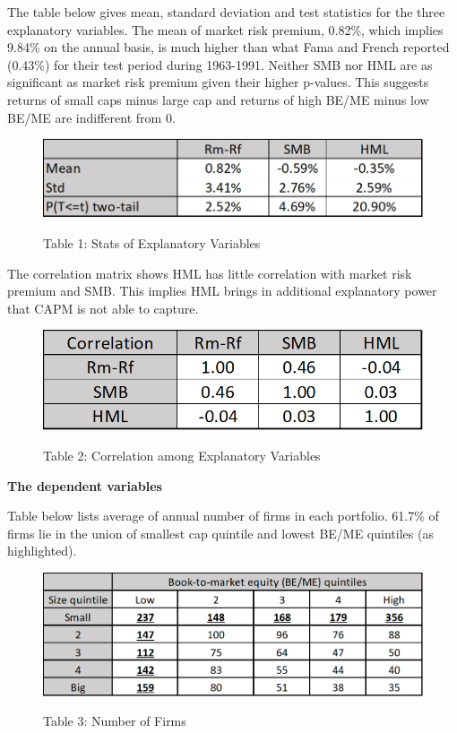 \documentclass[12pt]{article}
\begin{document}
\noindent The table below gives mean, standard deviation and test statistics for the three explanatory variables. The mean of market risk premium, 0.82\%, which implies 9.84\% on the annual basis, is much higher than what Fama and French reported (0.43\%) for their test period during 1963-1991. Neither SMB nor HML are as significant as market risk premium given their higher p-values. This suggests returns of small caps minus large cap and returns of high BE/ME minus low BE/ME are indifferent from 0.


\begin{figure}[h]
	\centering
	\caption*{Table 1: Stats of Explanatory Variables}
	\includegraphics[width=0.5\linewidth]{A1.png}
	\label{fig:label}
\end{figure}


\noindent The correlation matrix shows HML has little correlation with market risk premium and SMB. This implies HML brings in additional explanatory power that CAPM is not able to capture.

\begin{figure}[h]
	\centering
	\caption*{Table 2: Correlation among Explanatory Variables}
	\includegraphics[width=0.35\linewidth]{A2.png}
	\label{fig:label}
\end{figure}


\textbf{The dependent variables}   

Table below lists average of annual number of firms in each portfolio. 61.7\% of firms lie in the union of smallest cap quintile and lowest BE/ME quintiles (as highlighted).



\begin{figure}[h]
	\centering
	\caption*{Table 3: Number of Firms}
	\includegraphics[width=0.5\linewidth]{A3.png}
	\label{fig:label}
\end{figure}
\end{document}
